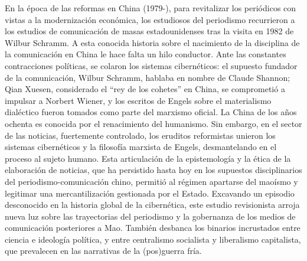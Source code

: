 \documentclass{tufte-handout}
\begin{document}
En la época de las reformas en China (1979-), para revitalizar los
periódicos con vistas a la modernización económica, los estudiosos del
periodismo recurrieron a los estudios de comunicación de masas
estadounidenses tras la visita en 1982 de Wilbur Schramm. A esta
conocida historia sobre el nacimiento de la disciplina de la
comunicación en China le hace falta un hilo conductor. Ante las
constantes contracciones políticas, se colaron los sistemas
cibernéticos: el supuesto fundador de la comunicación, Wilbur Schramm,
hablaba en nombre de Claude Shannon; Qian Xuesen, considerado el ``rey
de los cohetes'' en China, se comprometió a impulsar a Norbert Wiener, y
los escritos de Engels sobre el materialismo dialéctico fueron tomados
como parte del marxismo oficial. La China de los años ochenta es
conocida por el renacimiento del humanismo. Sin embargo, en el sector de
las noticias, fuertemente controlado, los eruditos reformistas unieron
los sistemas cibernéticos y la filosofía marxista de Engels,
desmantelando en el proceso al sujeto humano. Esta articulación de la
epistemología y la ética de la elaboración de noticias, que ha
persistido hasta hoy en los supuestos disciplinarios del
periodismo-comunicación chino, permitió al régimen apartarse del maoísmo
y legitimar una mercantilización gestionada por el Estado. Excavando un
episodio desconocido en la historia global de la cibernética, este
estudio revisionista arroja nueva luz sobre las trayectorias del
periodismo y la gobernanza de los medios de comunicación posteriores a
Mao. También desbanca los binarios incrustados entre ciencia e ideología
política, y entre centralismo socialista y liberalismo capitalista, que
prevalecen en las narrativas de la (pos)guerra fría.

\newpage
\end{document}
